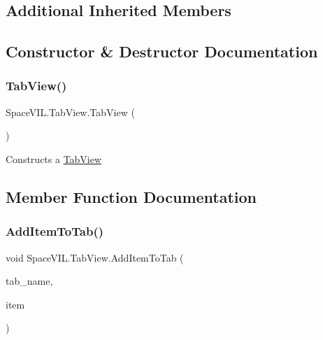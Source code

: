 \subsection*{Additional Inherited Members}


\subsection{Constructor \& Destructor Documentation}
\mbox{\label{class_space_v_i_l_1_1_tab_view_ade6f178694207c08c008d3caee32dcd5}} 
\subsubsection{\texorpdfstring{Tab\+View()}{TabView()}}
{\footnotesize\ttfamily Space\+V\+I\+L.\+Tab\+View.\+Tab\+View (\begin{DoxyParamCaption}{ }\end{DoxyParamCaption})}



Constructs a \mbox{\hyperlink{class_space_v_i_l_1_1_tab_view}{Tab\+View}} 



\subsection{Member Function Documentation}
\mbox{\label{class_space_v_i_l_1_1_tab_view_a1372d1fa43f967c2c7f8f5f11fa5b214}} 
\subsubsection{\texorpdfstring{Add\+Item\+To\+Tab()}{AddItemToTab()}}
{\footnotesize\ttfamily void Space\+V\+I\+L.\+Tab\+View.\+Add\+Item\+To\+Tab (\begin{DoxyParamCaption}\item[{String}]{tab\+\_\+name,  }\item[{\mbox{\hyperlink{interface_space_v_i_l_1_1_core_1_1_i_base_item}{I\+Base\+Item}}}]{item }\end{DoxyParamCaption})}



